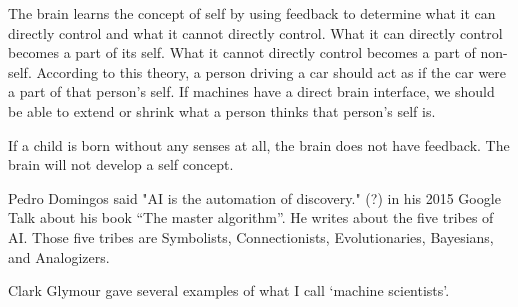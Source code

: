 The brain learns the concept of self by using feedback
to determine what it can directly control
and what it cannot directly control.
What it can directly control becomes a part of its self.
What it cannot directly control becomes a part of non-self.
According to this theory, a person driving a car
should act as if the car were a part of that person's self.
If machines have a direct brain interface,
we should be able to extend or shrink what a person thinks that person's self is.

If a child is born without any senses at all,
the brain does not have feedback.
The brain will not develop a self concept.

Pedro Domingos said
"AI is the automation of discovery." (?)
in his 2015 Google Talk about his book ``The master algorithm''.
He writes about the five tribes of AI.
Those five tribes are Symbolists, Connectionists, Evolutionaries, Bayesians, and Analogizers.

Clark Glymour gave several examples of what I call `machine scientists'.
\cite{GlyAutoDisc}
